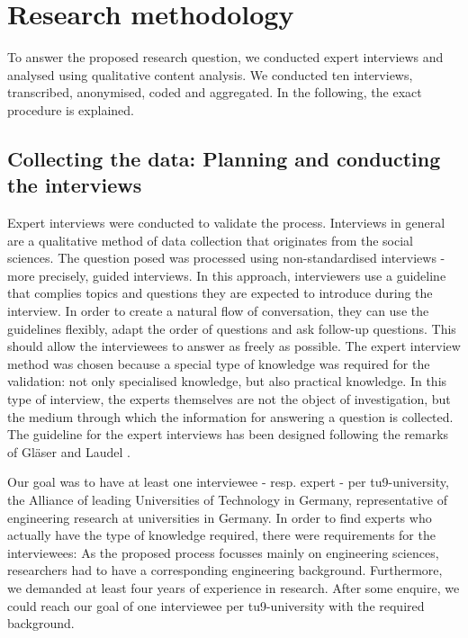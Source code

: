 \documentclass{bausteinefdm}
\begin{document}
\section{Research methodology} 
\label{Research methodology}

To answer the proposed research question, we conducted expert interviews and analysed using qualitative content analysis.
We conducted ten interviews, transcribed, anonymised, coded and aggregated.
In the following, the exact procedure is explained.

\subsection{Collecting the data: Planning and conducting the interviews}
\label{Interviews}
Expert interviews were conducted to validate the process. 
Interviews in general are a qualitative method of data collection that originates from the social sciences. \cite{Bogner.2009b, Froschauer.2009}
The question posed was processed using non-standardised interviews - more precisely, guided interviews. 
In this approach, interviewers use a guideline that complies topics and questions they are expected to introduce during the interview. 
In order to create a natural flow of conversation, they can use the guidelines flexibly, adapt the order of questions and ask follow-up questions. 
This should allow the interviewees to answer as freely as possible. 
The expert interview method was chosen because a special type of knowledge was required for the validation: 
not only specialised knowledge, but also practical knowledge. 
In this type of interview, the experts themselves are not the object of investigation, but the medium through which the information for answering a question is collected. \cite{Glaser.2010}
The guideline for the expert interviews has been designed following the remarks of Gläser and Laudel \cite{Glaser.2010}.


Our goal was to have at least one interviewee - resp. expert - per \ac{tu9}-university, the Alliance of leading Universities of Technology in Germany, representative of engineering research at universities in Germany. 
In order to find experts who actually have the type of knowledge required, there were requirements for the interviewees: 
As the proposed process focusses mainly on engineering sciences, researchers had to have a corresponding engineering background.
Furthermore, we demanded at least four years of experience in research.
After some enquire, we could reach our goal of one interviewee per \ac{tu9}-university with the required background.
\end{document}
